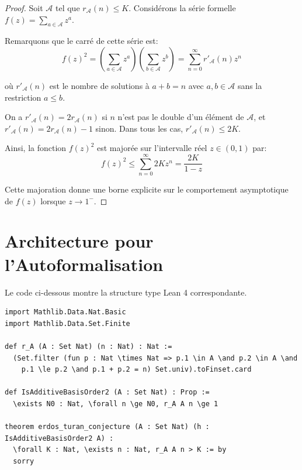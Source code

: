 \documentclass[11pt,a4paper]{article}
\begin{document}
\begin{proof}
Soit $\mathcal{A}$ tel que $r_{\mathcal{A}}(n) \le K$. Consid\'erons la s\'erie formelle $f(z) = \sum_{a \in \mathcal{A}} z^a$.

Remarquons que le carr\'e de cette s\'erie est:
\begin{equation*}
f(z)^2 = \left( \sum_{a \in \mathcal{A}} z^a \right) \left( \sum_{b \in \mathcal{A}} z^b \right) = \sum_{n=0}^{\infty} r'_{\mathcal{A}}(n) z^n
\end{equation*}

o\`u $r'_{\mathcal{A}}(n)$ est le nombre de solutions \`a $a+b=n$ avec $a,b \in \mathcal{A}$ sans la restriction $a \le b$.

On a $r'_{\mathcal{A}}(n) = 2 r_{\mathcal{A}}(n)$ si $n$ n'est pas le double d'un \'el\'ement de $\mathcal{A}$, et $r'_{\mathcal{A}}(n) = 2 r_{\mathcal{A}}(n) - 1$ sinon. Dans tous les cas, $r'_{\mathcal{A}}(n) \le 2K$.

Ainsi, la fonction $f(z)^2$ est major\'ee sur l'intervalle r\'eel $z \in (0,1)$ par:
\begin{equation*}
f(z)^2 \le \sum_{n=0}^{\infty} 2K z^n = \frac{2K}{1-z}
\end{equation*}

Cette majoration donne une borne explicite sur le comportement asymptotique de $f(z)$ lorsque $z \to 1^-$.


\end{proof}

\section{Architecture pour l'Autoformalisation}
Le code ci-dessous montre la structure type Lean 4 correspondante.

\begin{verbatim}
import Mathlib.Data.Nat.Basic
import Mathlib.Data.Set.Finite

def r_A (A : Set Nat) (n : Nat) : Nat :=
  (Set.filter (fun p : Nat \times Nat => p.1 \in A \and p.2 \in A \and
    p.1 \le p.2 \and p.1 + p.2 = n) Set.univ).toFinset.card

def IsAdditiveBasisOrder2 (A : Set Nat) : Prop :=
  \exists N0 : Nat, \forall n \ge N0, r_A A n \ge 1

theorem erdos_turan_conjecture (A : Set Nat) (h : IsAdditiveBasisOrder2 A) :
  \forall K : Nat, \exists n : Nat, r_A A n > K := by
  sorry
\end{verbatim}
\end{document}
